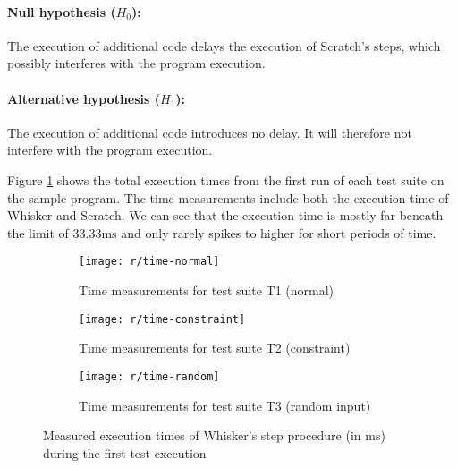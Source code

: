 \clearpage

\paragraph{Null hypothesis ($H_0$):}
The execution of additional code delays the execution of Scratch's steps, which possibly interferes with the program execution.
\vspace{-\medskipamount}
\paragraph{Alternative hypothesis ($H_1$):}
The execution of additional code introduces no delay. It will therefore not interfere with the program execution.
\parspace

\noindent Figure \ref{fig:time_line_plot} shows the total execution times
from the first run of each test suite on the sample program.
The time measurements include both the execution time of Whisker and Scratch.
We can see that the execution time is mostly far beneath the limit of $33.33\text{ms}$
and only rarely spikes to higher for short periods of time.
\parspace

\begin{figure}[htpb]
    \centering

    \begin{subfigure}{\textwidth}
        \centering
        \texttt{[image: r/time-normal]}
        \vspace{-\medskipamount}
        \caption{Time measurements for test suite T1 (normal)}
    \end{subfigure}

    \bigskip

    \begin{subfigure}{\textwidth}
        \centering
        \texttt{[image: r/time-constraint]}
        \vspace{-\medskipamount}
        \caption{Time measurements for test suite T2 (constraint)}
    \end{subfigure}

    \bigskip

    \begin{subfigure}{\textwidth}
        \centering
        \texttt{[image: r/time-random]}
        \vspace{-\medskipamount}
        \caption{Time measurements for test suite T3 (random input)}
    \end{subfigure}

    \caption{Measured execution times of Whisker's step procedure (in ms) during the first test execution}
    \label{fig:time_line_plot}
\end{figure}

